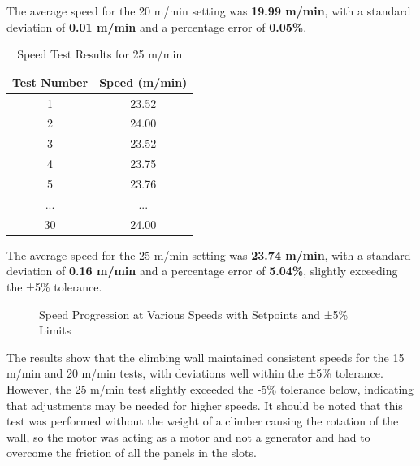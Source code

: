 The average speed for the 20 m/min setting was \textbf{19.99 m/min}, with a standard deviation of \textbf{0.01 m/min} and a percentage error of \textbf{0.05\%}.

\begin{table}[H]
\centering
\caption{Speed Test Results for 25 m/min}
\label{tab:speed_test_25}
\begin{tabular}{|c|c|}
\hline
\textbf{Test Number} & \textbf{Speed (m/min)} \\ \hline
1  & 23.52 \\ \hline
2  & 24.00 \\ \hline
3  & 23.52 \\ \hline
4  & 23.75 \\ \hline
5  & 23.76 \\ \hline
...  & ...  \\ \hline
30 & 24.00 \\ \hline
\end{tabular}
\end{table}
The average speed for the 25 m/min setting was \textbf{23.74 m/min}, with a standard deviation of \textbf{0.16 m/min} and a percentage error of \textbf{5.04\%}, slightly exceeding the ±5\% tolerance.

\begin{figure}[H]
    \centering
    \caption{Speed Progression at Various Speeds with Setpoints and ±5\% Limits}
    \label{fig:speed_progression}
\end{figure}

The results show that the climbing wall maintained consistent speeds for the 15 m/min and 20 m/min tests, with deviations well within the ±5\% tolerance. However, the 25 m/min test slightly exceeded the -5\% tolerance below, indicating that adjustments may be needed for higher speeds. It should be noted that this test was performed without the weight of a climber causing the rotation of the wall, so the motor was acting as a motor and not a generator and had to overcome the friction of all the panels in the slots.

